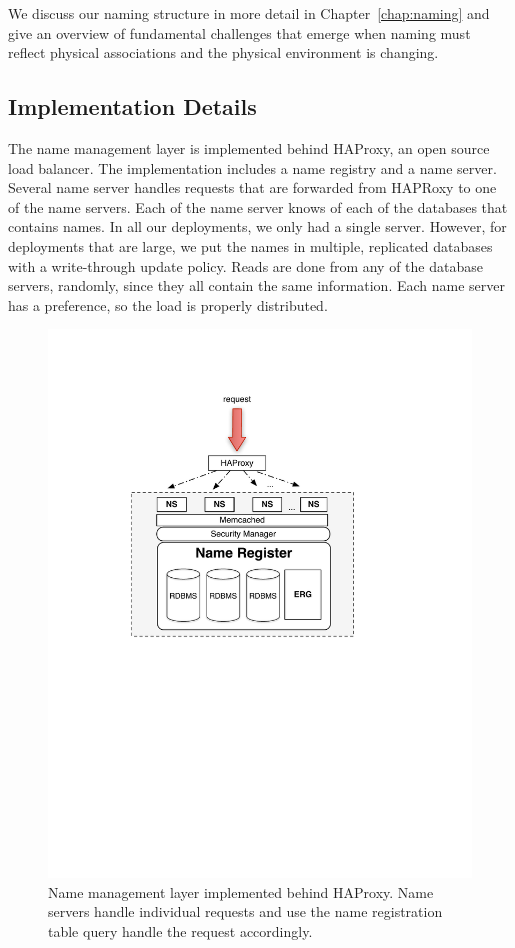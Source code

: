 We discuss our naming structure in more detail in Chapter~\ref{chap:naming} and give an overview of fundamental challenges that emerge when
naming must reflect physical associations and the physical environment is changing.

\subsection{Implementation Details}

The name management layer is implemented behind HAProxy, an open source load balancer. The implementation includes 
a name registry and a name server.  Several name server handles requests that are forwarded
from HAPRoxy to one of the name servers.  Each of the name server knows of each of the databases that contains names. 
In all our deployments, we only had a single server.  However, for deployments that are large, we put the names in multiple, 
replicated databases with a write-through update policy.  Reads are done from any of the database servers, randomly, since
they all contain the same information.  Each name server has a preference, so the load is properly distributed.

\begin{figure}[h!] %
\centering
\includegraphics[width=.55\columnwidth]{figs/name_reg}
\caption{Name management layer implemented behind HAProxy.  Name servers handle individual requests and use the name registration table
query handle the request accordingly.}
\label{fig:nameserver}
\end{figure}

